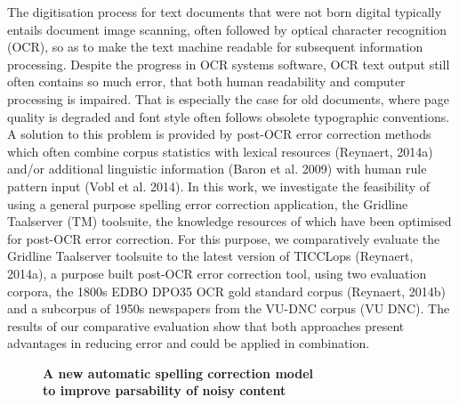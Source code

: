 \documentclass[10pt, a4paper, twopage, headinclude, footinclude, BCOR5mm]{book}
\begin{document}
The digitisation process for text documents that were not born digital typically entails document image scanning, often followed by optical character recognition (OCR), so as to make the text machine readable for subsequent information processing. Despite the progress in OCR systems software, OCR text output still often contains so much error, that both human readability and computer processing is impaired. That is especially the case for old documents, where page quality is degraded and font style often follows obsolete typographic conventions. A solution to this problem is provided by post-OCR error correction methods which often combine corpus statistics with lexical resources (Reynaert, 2014a) and/or additional linguistic information (Baron et al. 2009) with human rule pattern input (Vobl et al. 2014).  In this work, we investigate the feasibility of using a general purpose spelling error correction application, the Gridline Taalserver (TM) toolsuite, the knowledge resources of which have been optimised for post-OCR error correction. For this purpose, we comparatively evaluate the Gridline Taalserver toolsuite to the latest version of TICCLops (Reynaert, 2014a), a purpose built post-OCR error correction tool, using two evaluation corpora, the 1800s EDBO DPO35 OCR gold standard corpus (Reynaert, 2014b) and a subcorpus of 1950s newspapers from the VU-DNC corpus (VU DNC). The results of our comparative evaluation show that both approaches present advantages in reducing error and could be applied in combination.    

\newpage

\begin{figure}[t!]
\centering
\large\textbf{A new automatic spelling correction model \\ to improve parsability of noisy content}
\vspace*{0.5cm}
\end{figure}
\end{document}
